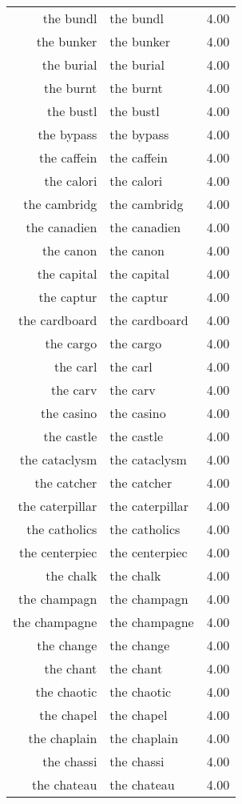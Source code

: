 \begin{table}[ht]
\begin{tabular}{rlr}
  the bundl & the bundl & 4.00 \\ 
  the bunker & the bunker & 4.00 \\ 
  the burial & the burial & 4.00 \\ 
  the burnt & the burnt & 4.00 \\ 
  the bustl & the bustl & 4.00 \\ 
  the bypass & the bypass & 4.00 \\ 
  the caffein & the caffein & 4.00 \\ 
  the calori & the calori & 4.00 \\ 
  the cambridg & the cambridg & 4.00 \\ 
  the canadien & the canadien & 4.00 \\ 
  the canon & the canon & 4.00 \\ 
  the capital & the capital & 4.00 \\ 
  the captur & the captur & 4.00 \\ 
  the cardboard & the cardboard & 4.00 \\ 
  the cargo & the cargo & 4.00 \\ 
  the carl & the carl & 4.00 \\ 
  the carv & the carv & 4.00 \\ 
  the casino & the casino & 4.00 \\ 
  the castle & the castle & 4.00 \\ 
  the cataclysm & the cataclysm & 4.00 \\ 
  the catcher & the catcher & 4.00 \\ 
  the caterpillar & the caterpillar & 4.00 \\ 
  the catholics & the catholics & 4.00 \\ 
  the centerpiec & the centerpiec & 4.00 \\ 
  the chalk & the chalk & 4.00 \\ 
  the champagn & the champagn & 4.00 \\ 
  the champagne & the champagne & 4.00 \\ 
  the change & the change & 4.00 \\ 
  the chant & the chant & 4.00 \\ 
  the chaotic & the chaotic & 4.00 \\ 
  the chapel & the chapel & 4.00 \\ 
  the chaplain & the chaplain & 4.00 \\ 
  the chassi & the chassi & 4.00 \\ 
  the chateau & the chateau & 4.00 \\ 

\end{tabular}
\end{table}
